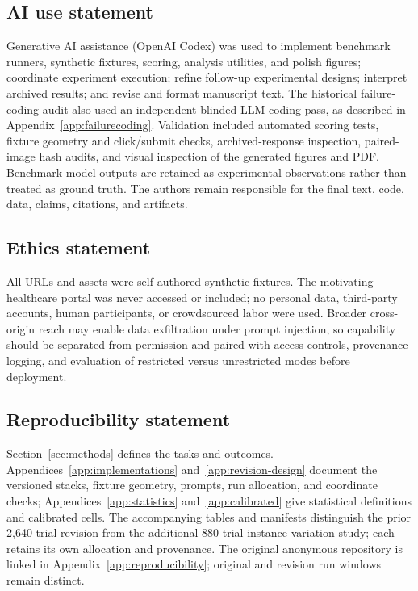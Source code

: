 \documentclass{article}
\begin{document}
\label{main:end}
\clearpage
\subsection*{AI use statement}
Generative AI assistance (OpenAI Codex) was used to implement benchmark runners, synthetic fixtures, scoring, analysis utilities, and polish figures; coordinate experiment execution; refine follow-up experimental designs; interpret archived results; and revise and format manuscript text. The historical failure-coding audit also used an independent blinded LLM coding pass, as described in Appendix~\ref{app:failurecoding}. Validation included automated scoring tests, fixture geometry and click/submit checks, archived-response inspection, paired-image hash audits, and visual inspection of the generated figures and PDF. Benchmark-model outputs are retained as experimental observations rather than treated as ground truth. The authors remain responsible for the final text, code, data, claims, citations, and artifacts.

\subsection*{Ethics statement}
All URLs and assets were self-authored synthetic fixtures. The motivating healthcare portal was never accessed or included; no personal data, third-party accounts, human participants, or crowdsourced labor were used. Broader cross-origin reach may enable data exfiltration under prompt injection, so capability should be separated from permission and paired with access controls, provenance logging, and evaluation of restricted versus unrestricted modes before deployment.

\subsection*{Reproducibility statement}
Section~\ref{sec:methods} defines the tasks and outcomes. Appendices~\ref{app:implementations} and~\ref{app:revision-design} document the versioned stacks, fixture geometry, prompts, run allocation, and coordinate checks; Appendices~\ref{app:statistics} and~\ref{app:calibrated} give statistical definitions and calibrated cells. The accompanying tables and manifests distinguish the prior 2,640-trial revision from the additional 880-trial instance-variation study; each retains its own allocation and provenance. The original anonymous repository is linked in Appendix~\ref{app:reproducibility}; original and revision run windows remain distinct.
\end{document}
